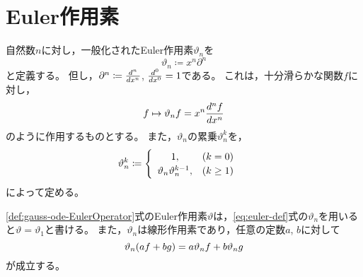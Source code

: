 \documentclass[a4paper,draft]{ltjsarticle}
\begin{document}
\section{Euler作用素}\label{sec:Euler作用素}
\newcommand{\eu}[1]{\vartheta_{#1}}
\newcommand{\Eu}[1]{x^{#1}\partial^{#1}}
\begin{defi}[一般化されたEuler作用素]
    自然数$n$に対し，一般化されたEuler作用素$\vartheta_n$を
    \begin{equation}
        \eu{n}\coloneqq \Eu{n}\label{eq:euler-def}
    \end{equation}
    と定義する。
    但し，$\partial^n \coloneqq \frac{d^{n} }{d x^{n}}$, $\frac{d^{0} }{d x^{0}}=1$である。
    これは，十分滑らかな関数$f$に対し，
    \begin{equation}
        f\mapsto \eu{n}f=x^n \diffn{f}{x}{n}
    \end{equation}
    のように作用するものとする。
    また，$\eu{n}$の累乗$\eu{n}^k$を，
    \begin{equation}
        \eu{n}^k\coloneqq\begin{cases}
            \begin{array}{cl}
                1, &\pare{k=0}
                \\
                \eu{n}\eu{n}^{k-1}, &\pare{k\geq 1}
            \end{array}
        \end{cases}
    \end{equation}
    によって定める。
\end{defi}

\eqref{def:gauss-ode-EulerOperator}式のEuler作用素$\vartheta$は，\eqref{eq:euler-def}式の$\eu{n}$を用いると$\vartheta=\eu{1}$と書ける。
また，$\eu{n}$は線形作用素であり，任意の定数$a$, $b$に対して
\begin{equation}
    \eu{n}\pare{af+bg}=a\eu{n}f+b\eu{n}g
\end{equation}
が成立する。
\end{document}
